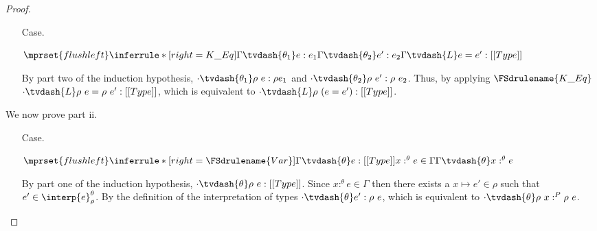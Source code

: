 \begin{proof}
\begin{itemize}
    \item[Case.]\ \\
      \begin{center}
        \begin{math}
          $$\mprset{flushleft}
          \inferrule* [right=K\_Eq] {
            \Gamma \tvdash{\theta_1} e:e_1
            \\\\
            \Gamma \tvdash{\theta_2} e':e_2
          }{\Gamma \tvdash{L} e = e':[[Type]]}
        \end{math}
      \end{center}
      By part two of the induction hypothesis, $\cdot \tvdash{\theta_1} \rho\ e:\rho e_1$ and
      $\cdot \tvdash{\theta_2} \rho\ e':\rho\ e_2$.  Thus, by applying $\FSdrulename{K\_Eq}$
      $\cdot \tvdash{L} \rho\ e = \rho\ e':[[Type]]$, which is equivalent to
      $\cdot \tvdash{L} \rho\ (e = e'):[[Type]]$.
  \end{itemize}
  
  We now prove part ii.
  \begin{itemize}
  \item[Case.] \ \\
    \begin{center}
      \begin{math}
        $$\mprset{flushleft}
        \inferrule* [right=\FSdrulename{Var}]{
          \Gamma \tvdash{\theta} e:[[Type]]
          \\\\
          x:^{\theta} e \in \Gamma
        }{\Gamma \tvdash{\theta} x:^{\theta} e}
      \end{math}
    \end{center}
    By part one of the induction hypothesis, $\cdot \tvdash{\theta} \rho\ e:[[Type]]$.  Since
    $x:^{\theta} e \in \Gamma$ then there exists a $x \mapsto e' \in \rho$ such that 
    $e' \in \interp{e}^\theta_\rho$.  By the definition of the interpretation of types
    $\cdot \tvdash{\theta} e':\rho\ e$, which is equivalent to 
    $\cdot \tvdash{\theta} \rho\ x:^{P} \rho\ e$.
    


\end{itemize}
\end{proof}
